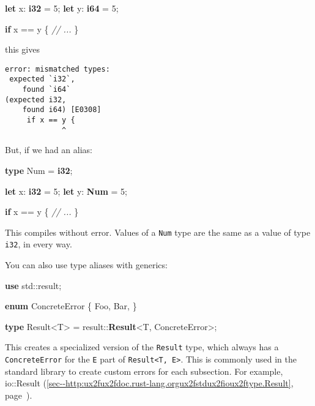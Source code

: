 \documentclass[a4paper,]{book}
\renewcommand*{\hyperref}[2][\ar]{%
  \def\ar{#2}%
  #2 (\autoref{#1}, page~\pageref{#1})}
\newenvironment{Shaded}{\begin{snugshade}}{\end{snugshade}}
\newcommand{\KeywordTok}[1]{\textcolor[rgb]{0.13,0.29,0.53}{\textbf{{#1}}}}
\newcommand{\DecValTok}[1]{\textcolor[rgb]{0.00,0.00,0.81}{{#1}}}
\newcommand{\CommentTok}[1]{\textcolor[rgb]{0.56,0.35,0.01}{\textit{{#1}}}}
\newcommand{\NormalTok}[1]{{#1}}
\begin{document}
\begin{Shaded}
\begin{Highlighting}[]
\KeywordTok{let} \NormalTok{x: }\KeywordTok{i32} \NormalTok{= }\DecValTok{5}\NormalTok{;}
\KeywordTok{let} \NormalTok{y: }\KeywordTok{i64} \NormalTok{= }\DecValTok{5}\NormalTok{;}

\KeywordTok{if} \NormalTok{x == y \{}
   \CommentTok{// ...}
\NormalTok{\}}
\end{Highlighting}
\end{Shaded}

this gives

\begin{verbatim}
error: mismatched types:
 expected `i32`,
    found `i64`
(expected i32,
    found i64) [E0308]
     if x == y {
             ^
\end{verbatim}

But, if we had an alias:

\begin{Shaded}
\begin{Highlighting}[]
\KeywordTok{type} \NormalTok{Num = }\KeywordTok{i32}\NormalTok{;}

\KeywordTok{let} \NormalTok{x: }\KeywordTok{i32} \NormalTok{= }\DecValTok{5}\NormalTok{;}
\KeywordTok{let} \NormalTok{y: }\KeywordTok{Num} \NormalTok{= }\DecValTok{5}\NormalTok{;}

\KeywordTok{if} \NormalTok{x == y \{}
   \CommentTok{// ...}
\NormalTok{\}}
\end{Highlighting}
\end{Shaded}

This compiles without error. Values of a \texttt{Num} type are the same
as a value of type \texttt{i32}, in every way.

You can also use type aliases with generics:

\begin{Shaded}
\begin{Highlighting}[]
\KeywordTok{use} \NormalTok{std::result;}

\KeywordTok{enum} \NormalTok{ConcreteError \{}
    \NormalTok{Foo,}
    \NormalTok{Bar,}
\NormalTok{\}}

\KeywordTok{type} \NormalTok{Result<T> = result::}\KeywordTok{Result}\NormalTok{<T, ConcreteError>;}
\end{Highlighting}
\end{Shaded}

This creates a specialized version of the \texttt{Result} type, which
always has a \texttt{ConcreteError} for the \texttt{E} part of
\texttt{Result\textless{}T,\ E\textgreater{}}. This is commonly used in
the standard library to create custom errors for each subsection. For
example,
\hyperref[sec--http:ux2fux2fdoc.rust-lang.orgux2fstdux2fioux2ftype.Result]{io::Result}.
\end{document}
